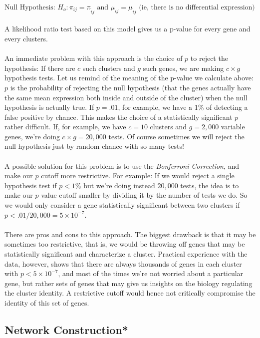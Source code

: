 $$
\mbox{Null Hypothesis: } H_o: \pi_{ij} = \pi_{\tilde{i}j} \mbox{ and } \mu_{ij} = \mu_{\tilde{i}j}\mbox{ (ie, there is no differential expression) }
$$
\\
A likelihood ratio test based on this model gives us a p-value for every gene and every clusters. \\
\\
An immediate problem with this approach is the choice of $p$ to reject the hypothesis: If there are $c$ such clusters and $g$ such genes, we are making $c \times g$ hypothesis tests. Let us remind of the meaning of the p-value we calculate above: $p$ is the probability of rejecting the null hypothesis (that the genes actually have the same mean expression both inside and outside of the cluster) when the null hypothesis is actually true. If $p = .01$, for example, we have a 1\% of detecting a false positive by chance. This makes the choice of a statistically significant $p$ rather difficult. If, for example, we have $c = 10$ clusters and $g = 2,000$ variable genes, we're doing $c \times g = 20,000$ tests. Of course sometimes we will reject the null hypothesis just by random chance with so many tests! \\
\\
A possible solution for this problem is to use the \emph{Bonferroni Correction}, and make our $p$ cutoff more restrictive. For example: If we would reject a single hypothesis test if $p < 1\%$ but we're doing instead $20,000$ tests, the idea is to make our $p$ value cutoff smaller by dividing it by the number of tests we do. So we would only consider a gene statistically significant between two clusters if $p < .01 / 20,000 = 5 \times 10^{-7}$. \\
\\
There are pros and cons to this approach. The biggest drawback is that it may be sometimes too restrictive, that is, we would be throwing off genes that may be statistically significant and characterize a cluster. Practical experience with the data, however, shows that there are always thousands of genes in each cluster with $p < 5 \times 10^{-7}$, and most of the times we're not worried about a particular gene, but rather sets of genes that may give us insights on the biology regulating the cluster identity. A restrictive cutoff would hence not critically compromise the identity of this set of genes.

\newpage
\subsection{Network Construction*}

